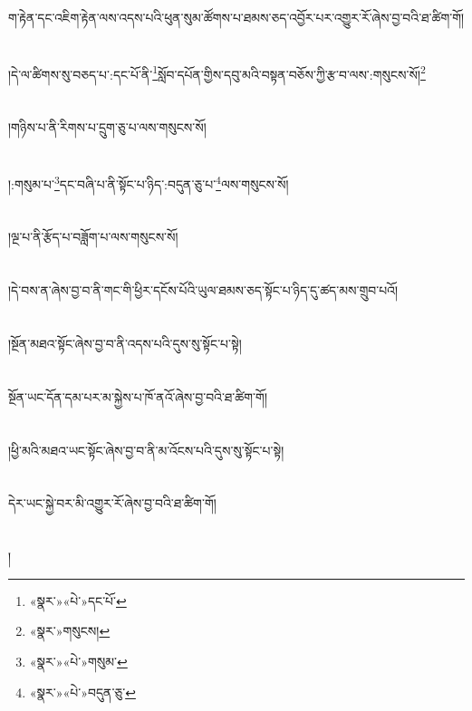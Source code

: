 ག་རྟེན་དང་འཇིག་རྟེན་ལས་འདས་པའི་ཕུན་སུམ་ཚོགས་པ་ཐམས་ཅད་འབྱོར་པར་འགྱུར་རོ་ཞེས་བྱ་བའི་ཐ་ཚིག་གོ།\chapter{ }།དེ་ལ་ཚིགས་སུ་བཅད་པ་:དང་པོ་ནི་\footnote{«སྣར་»«པེ་»དང་པོ་}སློབ་དཔོན་གྱིས་དབུ་མའི་བསྟན་བཅོས་ཀྱི་རྩ་བ་ལས་:གསུངས་སོ།\footnote{«སྣར་»གསུངས།}\chapter{ }།གཉིས་པ་ནི་རིགས་པ་དྲུག་ཅུ་པ་ལས་གསུངས་སོ།\chapter{ }།:གསུམ་པ་\footnote{«སྣར་»«པེ་»གསུམ་}དང་བཞི་པ་ནི་སྟོང་པ་ཉིད་:བདུན་ཅུ་པ་\footnote{«སྣར་»«པེ་»བདུན་ཅུ་}ལས་གསུངས་སོ།\chapter{ }།ལྔ་པ་ནི་རྩོད་པ་བཟློག་པ་ལས་གསུངས་སོ།\chapter{ }།དེ་བས་ན་ཞེས་བྱ་བ་ནི་གང་གི་ཕྱིར་དངོས་པོའི་ཡུལ་ཐམས་ཅད་སྟོང་པ་ཉིད་དུ་ཚད་མས་གྲུབ་པའོ།\chapter{ }།སྔོན་མཐའ་སྟོང་ཞེས་བྱ་བ་ནི་འདས་པའི་དུས་སུ་སྟོང་པ་སྟེ།\chapter{ }སྔོན་ཡང་དོན་དམ་པར་མ་སྐྱེས་པ་ཁོ་ནའོ་ཞེས་བྱ་བའི་ཐ་ཚིག་གོ།\chapter{ }།ཕྱི་མའི་མཐའ་ཡང་སྟོང་ཞེས་བྱ་བ་ནི་མ་འོངས་པའི་དུས་སུ་སྟོང་པ་སྟེ།\chapter{ }དེར་ཡང་སྐྱེ་བར་མི་འགྱུར་རོ་ཞེས་བྱ་བའི་ཐ་ཚིག་གོ།\chapter{ }།
